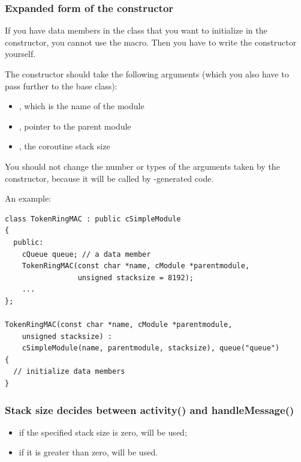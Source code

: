 \subsubsection{Expanded form of the constructor}

If you have data members in the class that you want to initialize in the
constructor, you cannot use the  macro.
Then you have to write the constructor yourself.

The constructor should take the following
arguments (which you also have to pass further to the base class):

\begin{itemize}
  \item{, which is the name of the module}
  \item{, pointer to the parent module}
  \item{, the coroutine stack size}
\end{itemize}

You should not change the number or types of the arguments taken
by the constructor, because it will be called by {\opp}-generated
code.

An example:

\begin{verbatim}
class TokenRingMAC : public cSimpleModule
{
  public:
    cQueue queue; // a data member
    TokenRingMAC(const char *name, cModule *parentmodule,
                 unsigned stacksize = 8192);
    ...
};

TokenRingMAC(const char *name, cModule *parentmodule,
    unsigned stacksize) :
    cSimpleModule(name, parentmodule, stacksize), queue("queue")
{
  // initialize data members
}
\end{verbatim}


\subsubsection{Stack size decides between activity() and handleMessage()}

\begin{itemize}
\item{if the specified stack size is zero,  will be used;}
\item{if it is greater than zero,  will be used.}
\end{itemize}

